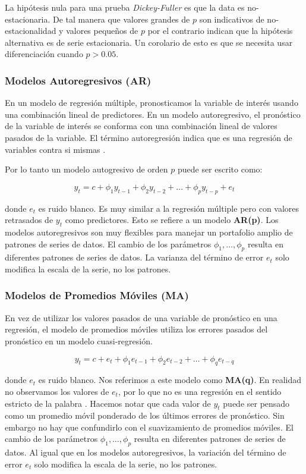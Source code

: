 \begin{spacing}{1.5}
La hipótesis nula para una prueba \emph{Dickey-Fuller} es que la data es no-estacionaria. De tal manera que valores grandes de $p$ son indicativos de no-estacionalidad y valores pequeños de $p$ por el contrario indican que la hipótesis alternativa es de serie estacionaria. Un corolario de esto es que se necesita usar diferenciación cuando $p > 0.05$. 

\subsubsection{Modelos Autoregresivos (AR)}
En un modelo de regresión múltiple, pronosticamos la variable de interés usando una combinación lineal de predictores. En un modelo autoregresivo, el pronóstico de la variable de interés se conforma con una combinación lineal de valores pasados de la variable. El término autoregresión indica que es una regresión de variables contra si mismas \cite{hyndman}. 

Por lo tanto un modelo autogresivo de orden $p$ puede ser escrito como:

\[ y_{t} = c + \phi_{1}y_{t-1} + \phi_{2}y_{t-2} + \ldots + \phi_{p}y_{t-p} + e_{t}  \]

donde $e_{t}$ es ruido blanco. Es muy similar a la regresión múltiple pero con valores retrasados de $y_{t}$ como predictores. Esto se refiere a un modelo \textbf{AR(p)}. Los modelos autoregresivos son muy flexibles para manejar un portafolio amplio de patrones de series de datos. El cambio de los parámetros $\phi_1, \ldots, \phi_{p}$ resulta en diferentes patrones de series de datos. La varianza del término de error $e_t$ solo modifica la escala de la serie, no los patrones.

\subsubsection{Modelos de Promedios Móviles (MA)}
En vez de utilizar los valores pasados de una variable de pronóstico en una regresión, el modelo de promedios móviles utiliza los errores pasados del pronóstico en un modelo cuasi-regresión.

\[ y_{t} = c + e_{t} + \phi_{1}e_{t-1} + \phi_{2}e_{t-2} + \ldots + \phi_{q}e_{t-q} \]

donde $e_{t}$ es ruido blanco. Nos referimos a este modelo como \textbf{MA(q)}. En realidad no observamos los valores de $e_{t}$, por lo que no es una regresión en el sentido estricto de la palabra \cite{hyndman}. Hacemos notar que cada valor de $y_{t}$ puede ser pensado como un promedio móvil ponderado de los últimos errores de pronóstico. Sin embargo no hay que confundirlo con el suavizamiento de promedios móviles. El cambio de los parámetros $\phi_1, \ldots, \phi_{p}$ resulta en diferentes patrones de series de datos. Al igual que en los modelos autoregresivos, la variación del término de error $e_t$ solo modifica la escala de la serie, no los patrones.


\end{spacing}
